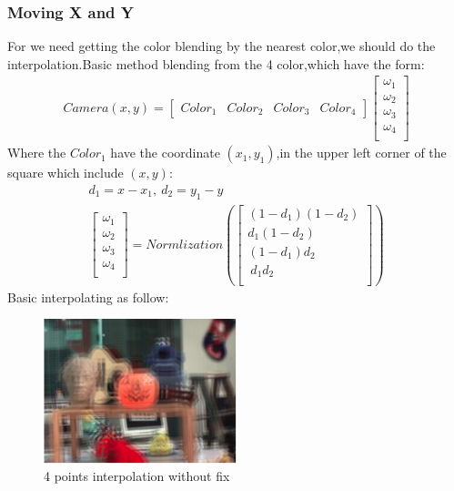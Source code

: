 \documentclass[letterpaper,12pt]{article}
\begin{document}
\subsubsection{Moving X and Y}
For we need getting the color blending by the nearest color,we should do the interpolation.Basic method blending from the 4 color,which have the form:
\begin{equation*}
\begin{aligned}
Camera(x,y)= \begin{bmatrix}
Color_1 & Color_2 & Color_3 & Color_4
\end{bmatrix}
\begin{bmatrix}
\omega_1 \\
\omega_2 \\
\omega_3 \\
\omega_4 \\
\end{bmatrix}
\end{aligned}
\end{equation*}
Where the $Color_1$ have the coordinate $(x_1,y_1)$,in the upper left corner of the square which include $(x,y)$: 
\begin{equation*}
\begin{aligned}
d_1 = x-x_1,\ d_2=y_1-y\\
\begin{bmatrix}
\omega_1 \\
\omega_2 \\
\omega_3 \\
\omega_4 \\
\end{bmatrix}
=
Normlization (
\begin{bmatrix}
(1-d_1)(1-d_2)\\
d_1 (1-d_2) \\
(1-d_1)d_2\\\
d_1 d_2 \\
\end{bmatrix}
)
\end{aligned}
\end{equation*}
Basic interpolating as follow:
\begin{figure}[h]
	\centering 
	\includegraphics[width=0.5\textwidth]{Image/base.png}
	\caption{4 points interpolation without fix}
\end{figure}
\newpage
\end{document}
